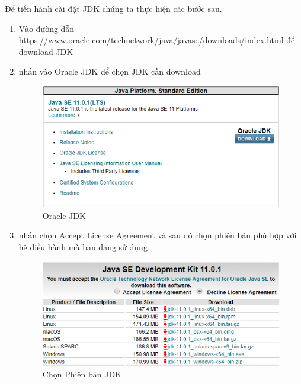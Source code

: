  Để tiến hành cài đặt JDK chúng ta thực hiện các bước sau.
 \begin{enumerate}
     \item Vào đường dẫn \url{https://www.oracle.com/technetwork/java/javase/downloads/index.html} để download JDK
     \item nhấn vào Oracle JDK để chọn JDK cần download
\begin{center}
    \begin{figure}[htp]
    \begin{center}
     \includegraphics[scale=1.0]{image3/OracleJDK}
    \end{center}
    \caption{Oracle JDK}
    \label{refhinh1}
    \end{figure}
\end{center}
    \item nhấn chọn Accept License Agreement và sau đó chọn phiên bản phù hợp với hệ điều hành mà bạn đang sử dụng
\begin{center}
    \begin{figure}[htp]
    \begin{center}
     \includegraphics[scale=1.0]{image3/JDK}
    \end{center}
    \caption{Chọn Phiên bản JDK}
    \label{refhinh1}
    \end{figure}

\end{center}
\end{enumerate}
